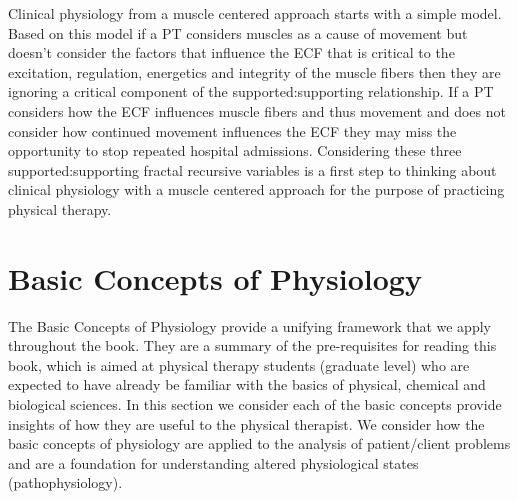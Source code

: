 Clinical physiology from a muscle centered approach starts with a simple model. Based on this model if a PT considers muscles as a cause of movement but doesn't consider the factors that influence the ECF that is critical to the excitation, regulation, energetics\footnotemark{} and integrity of the muscle fibers then they are ignoring a critical component of the supported:supporting relationship. If a PT considers how the ECF influences muscle fibers and thus movement and does not consider how continued movement influences the ECF they may miss the opportunity to stop repeated hospital admissions.\footnotemark{} Considering these three supported:supporting fractal recursive variables is a first step to thinking about clinical physiology with a muscle centered approach for the purpose of practicing physical therapy.

\section{Basic Concepts of  Physiology}

The Basic Concepts of Physiology provide a unifying framework that we apply throughout the book. They are a summary of the pre-requisites for reading this book, which is aimed at physical therapy students (graduate level) who are expected to have already be familiar with the basics of physical, chemical and biological sciences. In this section we consider each of the basic concepts provide insights of how they are useful to the physical therapist. We consider how the basic concepts of physiology are applied to the analysis of patient/client problems and are a foundation for understanding altered physiological states (pathophysiology).

